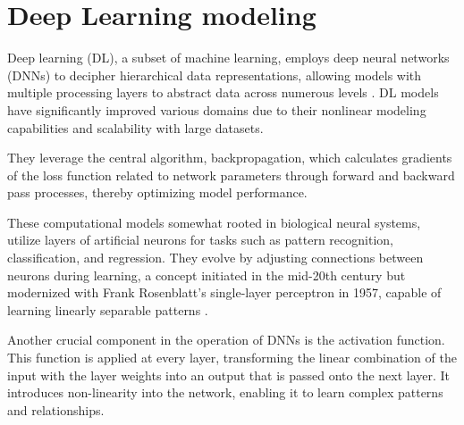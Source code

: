 \section{Deep Learning modeling}

Deep learning (DL), a subset of machine learning, employs deep neural networks (DNNs) to decipher hierarchical data representations, allowing models with multiple processing layers to abstract data across numerous levels \cite{LeCun2015DeepLearning, Sarker2021DeepDirections}. DL models have significantly improved various domains due to their nonlinear modeling capabilities and scalability with large datasets.

They leverage the central algorithm, backpropagation, which calculates gradients of the loss function related to network parameters through forward and backward pass processes, thereby optimizing model performance.



These computational models somewhat rooted in biological neural systems, utilize layers of artificial neurons for tasks such as pattern recognition, classification, and regression. They evolve by adjusting connections between neurons during learning, a concept initiated in the mid-20th century but modernized with Frank Rosenblatt's single-layer perceptron in 1957, capable of learning linearly separable patterns \cite{perceptron}.



Another crucial component in the operation of DNNs is the activation function. This function is applied at every layer, transforming the linear combination of the input with the layer weights into an output that is passed onto the next layer. It introduces non-linearity into the network, enabling it to learn complex patterns and relationships.



\newpage